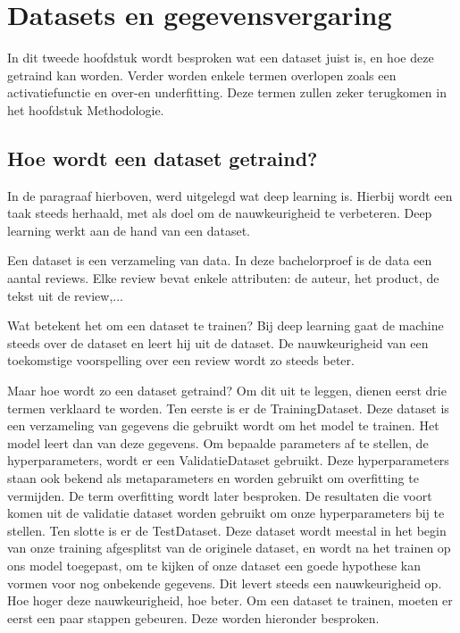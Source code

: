 \section{Datasets en gegevensvergaring}
\label{sec:datasetsgegevensvergaring}
In dit tweede hoofdstuk wordt besproken wat een dataset juist is, en hoe deze getraind kan worden. Verder worden enkele termen overlopen zoals een activatiefunctie en over-en underfitting. Deze termen zullen zeker terugkomen in het hoofdstuk Methodologie. 

\subsection{Hoe wordt een dataset getraind?}
\label{sec:hoewordtdatasetgetraind}
In de paragraaf hierboven, werd uitgelegd wat deep learning is. Hierbij wordt een taak steeds herhaald, met als doel om de nauwkeurigheid te verbeteren. Deep learning werkt aan de hand van een dataset. 

Een dataset is een verzameling van data. In deze bachelorproef is de data een aantal reviews. Elke review bevat enkele attributen: de auteur, het product, de tekst uit de review,...

Wat betekent het om een dataset te trainen? Bij deep learning gaat de machine steeds over de dataset en leert hij uit de dataset. De nauwkeurigheid van een toekomstige voorspelling over een review wordt zo steeds beter. 

Maar hoe wordt zo een dataset getraind?
Om dit uit te leggen, dienen eerst drie termen verklaard te worden. Ten eerste is er de \gls{TrainingDataset}. Deze dataset is een verzameling van gegevens die gebruikt wordt om het model te trainen. Het model leert dan van deze gegevens. Om bepaalde parameters af te stellen, de hyperparameters, wordt er een \gls{ValidatieDataset} gebruikt. Deze hyperparameters staan ook bekend als metaparameters en worden gebruikt om overfitting te vermijden. De term overfitting wordt later besproken. De resultaten die voort komen uit de validatie dataset worden gebruikt om onze hyperparameters bij te stellen. Ten slotte is er de \gls{TestDataset}. Deze dataset wordt meestal in het begin van onze training afgesplitst van de originele dataset, en wordt na het trainen op ons model toegepast, om te kijken of onze dataset een goede hypothese kan vormen voor nog onbekende gegevens. Dit levert steeds een nauwkeurigheid op. Hoe hoger deze nauwkeurigheid, hoe beter. \autocite{Shah2017} Om een dataset te trainen, moeten er eerst een paar stappen gebeuren. Deze worden hieronder besproken. 

